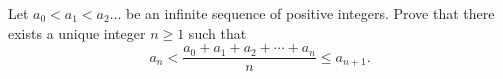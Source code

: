 Let $a_0 < a_1 < a_2 \ldots$ be an infinite sequence of positive integers. Prove that there exists a unique integer $n\geq 1$ such that\[a_n < \frac{a_0+a_1+a_2+\cdots+a_n}{n} \leq a_{n+1}.\]